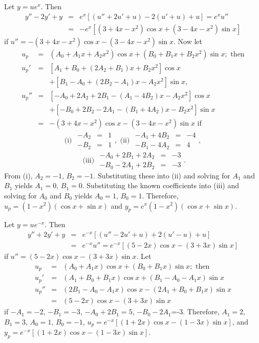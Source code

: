 \documentclass[dvips]{book}
\renewcommand{\exer}[1]{\par\medskip\;\noindent{\color{red}\bf #1.}}
\numberwithin{example}{section}
\numberwithin{equation}{section}
\numberwithin{theorem}{section}
\numberwithin{table}{section}
\numberwithin{figure}{section}
\begin{document}
\exer{5.5.16}
Let $y=ue^x$. Then
\begin{eqnarray*}
y''-2y'+y&=&e^x\left[(u''+2u'+u)-2(u'+u)+u\right]=e^xu''\\
&=&-e^x\left[(3+4x-x^2)\cos x+(3-4x-x^2)\sin x\right]
\end{eqnarray*}
 if $u''=-(3+4x-x^2)\cos x-(3-4x-x^2)\sin x$.
Now let
\begin{eqnarray*}
u_p&=&(A_0+A_1x+A_2x^2)\cos x +(B_0+B_1x+B_2x^2)\sin x;\mbox{ then}\\
u_p'&=&\left[A_1+B_0+(2A_2+B_1)x+B_2x^2\right]\cos x\\ &&
+\left[B_1-A_0+(2B_2-A_1)x-A_2x^2\right]\sin x, \\
u_p ''&=&\left[-A_0+2A_2+2B_1-(A_1-4B_2)x-A_2x^2\right]\cos x\\ &&+
\left[-B_0+2B_2-2A_1-(B_1+4A_2)x-B_2x^2\right]\sin x\\
&=&-(3+4x-x^2)\cos x-(3-4x-x^2)\sin x\mbox{ if }
\end{eqnarray*}
$$
\mbox{(i) } \begin{array}{rcl}-A_2&=&1\\ -B_2&=&1 \end{array},
\mbox{ (ii) } \begin{array}{rcr} -A_1+4B_2&=&-4
\\ -B_1-4A_2&=&4\end{array},
$$
$$
\mbox{ (iii) }
\begin{array}{rcr}-A_0+2B_1+2A_2&=&-3
\\ -B_0-2A_1+2B_2&=&-3\end{array}.
$$
From (i), $A_2=-1$, $B_2=-1$. Substituting these into (ii) and solving
for $A_1$ and $B_1$ yields $A_1=0$, $B_1=0$. Substituting the known
coefficients into (iii) and solving for $A_0$ and $B_0$ yields
$A_0=1$, $B_0=1$. Therefore,$u_p=(1-x^2)(\cos x+\sin x)$ and
$y_p=e^x(1-x^2)(\cos x+\sin x)$.


\exer{5.5.18}
Let $y=ue^{-x}$. Then
\begin{eqnarray*}
y''+2y'+y&=&e^{-x}\left[(u''-2u'+u)+2(u'-u)+u\right]\\ &=&
e^{-x}u''=e^{-x}\left[(5-2x)\cos x-(3+3x)\sin x\right]
\end{eqnarray*}
 if $u''=(5-2x)\cos x-(3+3x)\sin x$. Let
\begin{eqnarray*}
u_p&=&(A_0+A_1x)\cos x+(B_0+B_1x)\sin x; \mbox{ then}\\
u_p'&=&(A_1+B_0+B_1x)\cos x+(B_1-A_0-A_1x)\sin x\\
u_p''&=&(2B_1-A_0-A_1x)\cos x-(2A_1+B_0+B_1x)\sin x\\
&=&(5-2x)\cos x-(3+3x)\sin x
\end{eqnarray*}
if $-A_1=-2$, $-B_1=-3$, $-A_0+2B_1=5$, $-B_0-2A_1$=-3. Therefore,
$A_1=2$, $B_1=3$, $A_0=1$, $B_0=-1$, $u_p=e^{-x}\left[(1+2x)\cos
x-(1-3x)\sin x\right]$, and $y_p=e^{-x}\left[(1+2x)\cos x-(1-3x)\sin
x\right]$.
\end{document}
